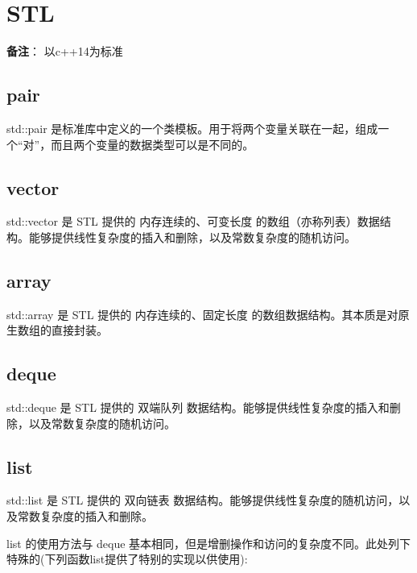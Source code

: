 \chapter{STL}

\begin{center}
\end{center}

\begin{mybox1}
\textbf{备注}： 以c++14为标准
\end{mybox1}

\section{pair}
std::pair 是标准库中定义的一个类模板。用于将两个变量关联在一起，组成一个“对”，而且两个变量的数据类型可以是不同的。


\section{vector}
std::vector 是 STL 提供的 内存连续的、可变长度 的数组（亦称列表）数据结构。能够提供线性复杂度的插入和删除，以及常数复杂度的随机访问。


\section{array}
std::array 是 STL 提供的 内存连续的、固定长度 的数组数据结构。其本质是对原生数组的直接封装。


\section{deque}
std::deque 是 STL 提供的 双端队列 数据结构。能够提供线性复杂度的插入和删除，以及常数复杂度的随机访问。


\section{list}
std::list 是 STL 提供的 双向链表 数据结构。能够提供线性复杂度的随机访问，以及常数复杂度的插入和删除。

list 的使用方法与 deque 基本相同，但是增删操作和访问的复杂度不同。此处列下特殊的(下列函数list提供了特别的实现以供使用):


